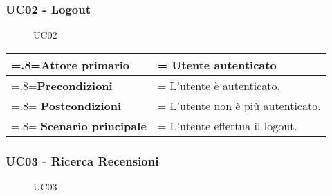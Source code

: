         \subsubsection{UC02 - Logout}
        \label{UC02}

            \begin{figure}[H]
                \centering
                
                \caption{UC02}
            \end{figure}

            \begin{center}
                \renewcommand{\arraystretch}{1.5}
                \renewcommand\tabularxcolumn[1]{m{#1}}
                \begin{tabularx}{0.9\textwidth} {
                    >{\hsize=.8\hsize\linewidth=\hsize}X
                    >{\hsize=1.2\hsize\linewidth=\hsize}X}
                    \hline
                    \textbf{Attore primario} & Utente autenticato \\
                    \hline
                    \textbf{Precondizioni} & L'utente è autenticato. \\
                    \hline
                    \textbf{Postcondizioni} & L'utente non è più autenticato. \\
                    \hline
                    \textbf{Scenario principale} & L'utente effettua il logout. \\
                    \hline
                \end{tabularx}
            \end{center}

        \subsubsection{UC03 - Ricerca Recensioni}
        \label{UC03}

            \begin{figure}[H]
                \centering
                
                \caption{UC03}
            \end{figure}

